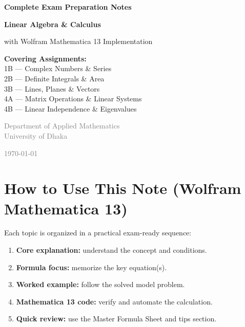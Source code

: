 \documentclass[12pt,a4paper]{article}
\begin{document}
\begin{titlepage}
    \centering
    \vspace*{2cm}
    
    {\Huge\bfseries\color{primary} Complete Exam Preparation Notes}
    
    \vspace{0.5cm}
    {\Large\bfseries\color{secondary} Linear Algebra \& Calculus}
    
    \vspace{0.5cm}
    {\large with Wolfram Mathematica 13 Implementation}
    
    \vspace{2cm}
    
    \begin{tcolorbox}[colback=lightbg, colframe=primary, sharp corners, width=0.8\textwidth, center]
        \centering
        \textbf{Covering Assignments:}\\
        \vspace{0.3cm}
        1B — Complex Numbers \& Series \\
        2B — Definite Integrals \& Area \\
        3B — Lines, Planes \& Vectors \\
        4A — Matrix Operations \& Linear Systems \\
        4B — Linear Independence \& Eigenvalues
    \end{tcolorbox}
    
    \vspace{2cm}
    
    \textcolor{gray}{Department of Applied Mathematics}\\
    \textcolor{gray}{University of Dhaka}
    
    \vfill
    \textcolor{gray}{\today}
\end{titlepage}

\tableofcontents
\newpage

\section*{How to Use This Note (Wolfram Mathematica 13)}

\begin{definitionbox}
    Each topic is organized in a practical exam-ready sequence:
    \begin{enumerate}
        \item \textbf{Core explanation:} understand the concept and conditions.
        \item \textbf{Formula focus:} memorize the key equation(s).
        \item \textbf{Worked example:} follow the solved model problem.
        \item \textbf{Mathematica 13 code:} verify and automate the calculation.
        \item \textbf{Quick review:} use the Master Formula Sheet and tips section.
    \end{enumerate}
\end{definitionbox}
\end{document}
